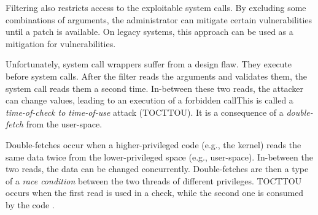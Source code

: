 Filtering also restricts access to the exploitable system
calls. By excluding some combinations of arguments, the administrator can 
mitigate certain vulnerabilities until a patch is available. On legacy systems,
this approach can be used as a mitigation for vulnerabilities. 



Unfortunately, system call wrappers suffer from a design flaw. They execute before system calls. After
the filter reads the arguments and validates them, the system call reads them a
second time. In-between these two reads, the attacker can change values,
leading to an execution of a forbidden callThis is called a
\emph{time-of-check to time-of-use} attack (TOCTTOU). It is a consequence of a
\emph{double-fetch} from the user-space.

Double-fetches occur when a higher-privileged code (e.g., the kernel) reads
the same data twice from the lower-privileged space
(e.g., user-space). In-between
the two reads, the data can be changed concurrently. Double-fetches are then
a type of a \emph{race condition} between the two threads of different privileges.
TOCTTOU occurs when the first read is used in a check, while the second one is
consumed by the code . 

